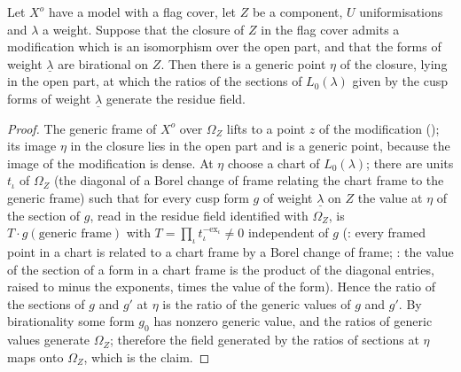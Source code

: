 \begin{proposition}\label{pf:lift2:ratgen}
Let $X^o$ have a model with a flag cover, let $Z$ be a component, $U$ uniformisations and $\lambda$ a weight. Suppose that
the closure of $Z$ in the flag cover admits a modification which is an isomorphism over the open part, and that the
forms of weight $\underline\lambda$ are birational on $Z$. Then there is a generic point $\eta$ of the closure, lying in
the open part, at which the ratios of the sections of $L_0(\lambda)$ given by the cusp forms of weight $\underline\lambda$
generate the residue field.
\end{proposition}

\begin{proof}
The generic frame of $X^o$ over $\Omega_Z$ lifts to a point $z$ of the modification
(); its image $\eta$ in the closure lies in the open part and is a generic
point, because the image of the modification is dense. At $\eta$ choose a chart of $L_0(\lambda)$; there are units
$t_\iota$ of $\Omega_Z$ (the diagonal of a Borel change of frame relating the chart frame to the generic frame) such that
for every cusp form $g$ of weight $\underline\lambda$ on $Z$ the value at $\eta$ of the section of $g$, read in the residue
field identified with $\Omega_Z$, is $T\cdot g(\text{generic frame})$ with $T=\prod_\iota t_\iota^{-\mathrm{ex}_\iota}\ne0$
independent of $g$ (: every framed point in a chart is related to a chart
frame by a Borel change of frame; : the value of the section of a form in a
chart frame is the product of the diagonal entries, raised to minus the exponents, times the value of the form).
Hence the ratio of the sections of $g$ and $g'$ at $\eta$ is the ratio of the generic values of $g$ and $g'$. By
birationality some form $g_0$ has nonzero generic value, and the ratios of generic values generate $\Omega_Z$; therefore the
field generated by the ratios of sections at $\eta$ maps onto $\Omega_Z$, which is the claim.
\end{proof}

